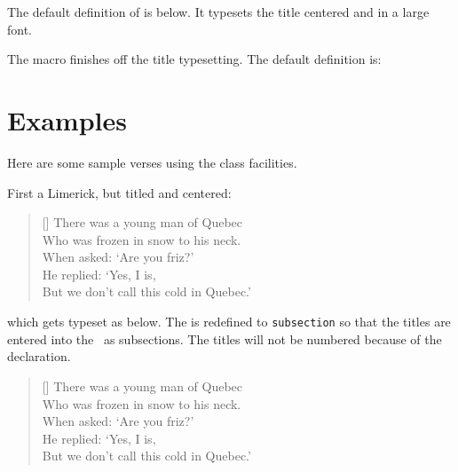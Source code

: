 The default definition of \cmd{\printPoemTitletitle} is below.
It typesets the title centered and in a large font.
\begin{lcode}
\newcommand*{\printPoemTitletitle}[1]{\PoemTitlefont #1}
\newcommand*{\PoemTitlefont}{\normalfont\large\centering}
\end{lcode}

The macro \cmd{\afterPoemTitle} finishes off the title 
typesetting. The default definition is:
\begin{lcode}
\newcommand*{\afterPoemTitle}{\par\nobreak\vskip \afterPoemTitleskip}
\newlength{\afterPoemTitleskip}
  \setlength{\afterPoemTitleskip}{1\onelineskip}
\end{lcode}



\section{Examples}

   Here are some sample verses using the class facilities.

First a Limerick, but titled and centered:
\begin{lcode}
\renewcommand{\poemtoc}{subsection}
\PlainPoemTitle
{}
\settowidth{\versewidth}{There was a young man of Quebec}
\begin{verse}[\versewidth]
There was a young man of Quebec \\
Who was frozen in snow to his neck. \\
\vin When asked: `Are you friz?' \\
\vin He replied: `Yes, I is, \\
But we don't call this cold in Quebec.'
\end{verse}
\end{lcode}
which gets typeset as below. The \cmd{\poemtoc} is redefined
to \texttt{subsection} so that the \cmd{\poemtitle} titles
are entered into the \toc\ as 
subsections. The titles will not be numbered because of the
\cmd{\PlainPoemTitle} declaration.

\renewcommand{\poemtoc}{subsection}
\PlainPoemTitle
{}
\settowidth{\versewidth}{There was a young man of Quebec}
\begin{verse}[\versewidth] 
There was a young man of Quebec \\
Who was frozen in snow to his neck. \\
\vin When asked: `Are you friz?' \\
\vin He replied: `Yes, I is, \\
But we don't call this cold in Quebec.'
\end{verse}

